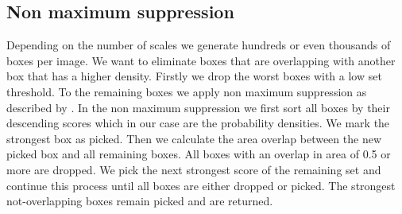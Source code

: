 \subsection{Non maximum suppression}
\label{sec:pipeline:eval:nms}
Depending on the number of scales we generate hundreds or even thousands of boxes per image. We want to eliminate boxes that are overlapping with another box that has a higher density. Firstly we drop the worst boxes with a low set threshold. To the remaining boxes we apply non maximum suppression as described by \citet{felzenszwalb_discriminatively_2008}. In the non maximum suppression we first sort all boxes by their descending scores which in our case are the probability densities. We mark the strongest box as picked. Then we calculate the area overlap between the new picked box and all remaining boxes. All boxes with an overlap in area of 0.5 or more are dropped. We pick the next strongest score of the remaining set and continue this process until all boxes are either dropped or picked. The strongest not-overlapping boxes remain picked and are returned. 
